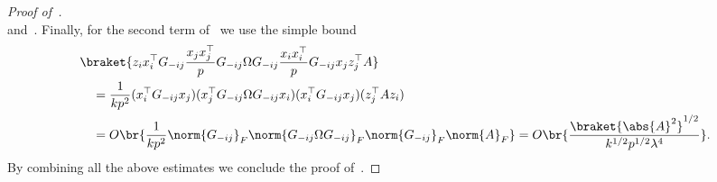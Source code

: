 \begin{proof}[Proof of~]
\begin{equation}
    \end{equation}
    and~.
    Finally, for the second term of~ we use the simple bound
    \begin{equation}
        \begin{split}
            &\braket{z_i x_i^\top  G_{-ij}\frac{x_jx_j^\top}{p}G_{-ij} \Omega  G_{-ij}\frac{x_ix_i^\top}{p}G_{-ij} x_j z_j^\top A} \\
            &\quad = \frac{1}{kp^2} (x_i^\top  G_{-ij} x_j)(x_j^\top G_{-ij} \Omega  G_{-ij} x_i) (x_i^\top G_{-ij} x_j) (z_j^\top A z_i) \\
            & \quad = O\br{\frac{1}{kp^2} \norm{G_{-ij}}_F \norm{G_{-ij}\Omega G_{-ij}}_F \norm{G_{-ij}}_F \norm{A}_F} = O\br{\frac{\braket{\abs{A}^2}^{1/2}}{k^{1/2}p^{1/2}\lambda^4}}.
        \end{split}
    \end{equation}
    By combining all the above estimates we conclude the proof of~.
\end{proof}


